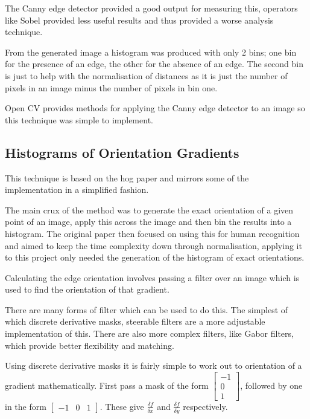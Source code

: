 The Canny edge detector\cite{Canny1986Computational} provided a good output for measuring this, 
operators like Sobel provided less useful results and thus provided a worse analysis technique.

From the generated image a histogram was produced with only 2 bins; one bin for the presence of an
edge, the other for the absence of an edge. The second bin is just to help with the normalisation
of distances as it is just the number of pixels in an image minus the number of pixels in bin one.

Open CV provides methods for applying the Canny edge detector to an image so this technique was 
simple to implement.


\subsection{Histograms of Orientation Gradients}
This technique is based on the \gls{hog} paper\cite{Dalal2005Histograms} and mirrors some of the
implementation in a simplified fashion.

The main crux of the method was to generate the exact orientation of a given point of an image,
apply this across the image and then bin the results into a histogram. The original paper then
focused on using this for human recognition and aimed to keep the time complexity down through
normalisation, applying it to this project only needed the generation of the histogram of exact
orientations.

Calculating the edge orientation involves passing a filter over an image which is used to find the
orientation of that gradient. 

There are many forms of filter which can be used to do this. The simplest of which discrete 
derivative masks, steerable filters 
are a more adjustable implementation of this. There are also more complex filters, like Gabor 
filters, which provide better flexibility and matching.

Using discrete derivative masks it is fairly simple to work out to orientation of a gradient 
mathematically. First pass a mask of the form $\left[\begin{smallmatrix}-1\\0\\1\end{smallmatrix}\right]$, followed
by one in the form $\left[\begin{smallmatrix}-1 & 0 & 1\end{smallmatrix}\right]$. These give 
$\frac{\delta f}{\delta x}$ and $\frac{\delta f}{\delta y}$ respectively.

